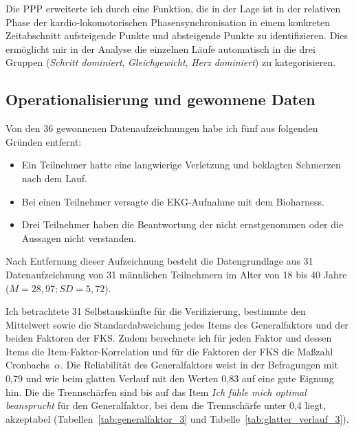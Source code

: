 Die \ac{PPP} erweiterte ich durch eine Funktion, die in der Lage ist in der relativen Phase der kardio-lokomotorischen Phasensynchronisation in einem konkreten Zeitabschnitt aufsteigende Punkte und absteigende Punkte zu identifizieren. Dies ermöglicht mir in der Analyse die einzelnen Läufe automatisch in die drei Gruppen (\emph{Schritt dominiert}, \emph{Gleichgewicht}, \emph{Herz dominiert}) zu kategorisieren. 

\subsection{Operationalisierung und gewonnene Daten} 

\label{sub:operationalisierung_und_gewonnene_daten_5_3}

Von den 36 gewonnenen Datenaufzeichnungen habe ich fünf aus folgenden Gründen entfernt: 
\begin{itemize}
	
	\item Ein Teilnehmer hatte eine langwierige Verletzung und beklagten Schmerzen nach dem Lauf.
	
	\item Bei einen Teilnehmer versagte die \ac{EKG}-Aufnahme mit dem Bioharness.
	
	\item Drei Teilnehmer haben die Beantwortung der nicht ernstgenommen oder die Aussagen nicht verstanden. 
\end{itemize}

Nach Entfernung dieser Aufzeichnung besteht die Datengrundlage aus 31 Datenaufzeichnung von 31 männlichen Teilnehmern im Alter von 18 bis 40 Jahre ($M = 28{,}97; SD = 5{,}72$).

Ich betrachtete 31 Selbstauskünfte für die Verifizierung, bestimmte den Mittelwert sowie die Standardabweichung jedes Items des Generalfaktors und der beiden Faktoren der \ac{FKS}. Zudem berechnete ich für jeden Faktor und dessen Items die Item-Faktor-Korrelation und für die Faktoren der \ac{FKS} die Maßzahl Cronbachs~$\alpha$. Die Reliabilität des Generalfaktors weist in der Befragungen mit 0,79 und wie beim glatten Verlauf mit den Werten 0,83 auf eine gute Eignung hin. Die die Trennschärfen sind bis auf das Item \emph{Ich fühle mich optimal beansprucht} für den Generalfaktor, bei dem die Trennschärfe unter 0,4 liegt, akzeptabel (Tabellen~\ref{tab:generalfaktor_3} und Tabelle~\ref{tab:glatter_verlauf_3}).

